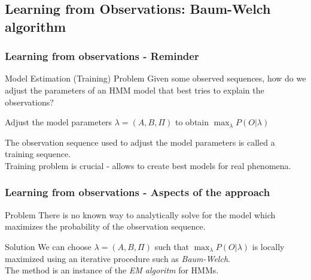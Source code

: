 \subsection[Baum-Welch algorithm]{Learning from Observations:
  Baum-Welch algorithm}
\label{sec:bw}

\begin{frame}[t]
	\frametitle{Learning from observations - Reminder}
	\begin{block}{Model Estimation (Training) Problem}
    	Given some observed sequences, how do we adjust the \alert{parameters} of an HMM model that best tries 	
    	to explain the observations?
  	\end{block}
  	\pause
  	
  	\begin{block}{}
  		Adjust the model parameters $\lambda = (A, B, \Pi)$ to obtain $\max_{\lambda} P(O \vert \lambda)$
  	\end{block}
  	\pause
  	
  	\begin{block}{}
  		The observation sequence used to adjust the model parameters is called a \alert{training} sequence.\\
  		Training problem is crucial - allows to create best models for real phenomena.
  	\end{block}
\end{frame}


\begin{frame}[t]
	\frametitle{Learning from observations - Aspects of the approach}
	\pause
		
	\begin{block}{\alert{Problem}}
    	There is no known way to analytically solve for the model which maximizes the probability of the
    	observation sequence.
  	\end{block}
  	\pause
  	
  	\begin{block}{Solution}
  		We can choose $\lambda = (A, B, \Pi)$ such that $\max_{\lambda} P(O \vert \lambda)$ is 
  		\alert{locally maximized} using an \alert{iterative procedure} such as \emph{Baum-Welch}.\\
  		The method is an instance of the \emph{EM algoritm} \parencite{dempster1977maximum} for HMMs.
  	\end{block}
  	
\end{frame}

